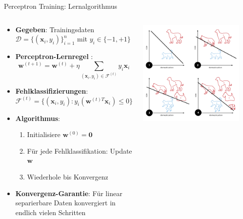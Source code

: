 \documentclass[aspectratio=1610, xcolor=dvipsnames, 9pt]{beamer}
\begin{document}
      \begin{frame}{Perceptron Training: Lernalgorithmus}
        \begin{columns}
          \begin{column}{0.7\textwidth}
            \begin{itemize}
              \item \textbf{Gegeben}: Trainingsdaten $\mathcal{D} = \{(\mathbf{x}_i, y_i)\}_{i=1}^n$ mit $y_i \in \{-1, +1\}$
              \item \textbf{Perceptron-Lernregel} \cite{rosenblatt1958}:
              \begin{equation}
                \mathbf{w}^{(t+1)} = \mathbf{w}^{(t)} + \eta \sum_{(\mathbf{x}_i, y_i) \in \mathcal{F}^{(t)}} y_i \mathbf{x}_i
              \end{equation}
              \item \textbf{Fehlklassifizierungen}: $\mathcal{F}^{(t)} = \{(\mathbf{x}_i, y_i) : y_i(\mathbf{w}^{(t)T}\mathbf{x}_i) \leq 0\}$
              \item \textbf{Algorithmus}:
              \begin{enumerate}
                \item Initialisiere $\mathbf{w}^{(0)} = \mathbf{0}$
                \item Für jede Fehlklassifikation: Update $\mathbf{w}$
                \item Wiederhole bis Konvergenz
              \end{enumerate}
              \item \textbf{Konvergenz-Garantie}: Für linear separierbare Daten konvergiert in endlich vielen Schritten
            \end{itemize}
          \end{column}
          \begin{column}{0.3\textwidth}
            \centering
            \includegraphics[width=0.9\textwidth]{images/Perceptron_example.svg.png}
          \end{column}
        \end{columns}
      \end{frame}
\end{document}
